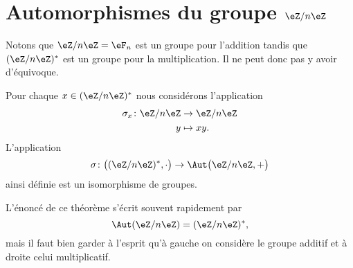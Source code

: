 \section{Automorphismes du groupe \texorpdfstring{\(  \eZ/n\eZ\)}{Z/nZ}}

Notons que \( \eZ/n\eZ=\eF_n\) est un groupe pour l'addition tandis que \( (\eZ/n\eZ)^*\) est un groupe pour la multiplication. Il ne peut donc pas y avoir d'équivoque.

\begin{theorem}   \label{ThoozyeSn}
	Pour chaque \( x\in (\eZ/n\eZ)^*\) nous considérons l'application
	\begin{equation}
		\begin{aligned}
			\sigma_x\colon \eZ/n\eZ & \to \eZ/n\eZ \\
			y                       & \mapsto xy.
		\end{aligned}
	\end{equation}
	L'application
	\begin{equation}
		\sigma\colon \big( (\eZ/n\eZ)^*,\cdot\big)\to \Aut\big( \eZ/n\eZ,+ \big)
	\end{equation}
	ainsi définie est un isomorphisme de groupes.
\end{theorem}
L'énoncé de ce théorème s'écrit souvent rapidement par
\begin{equation}
	\Aut(\eZ/n\eZ)=(\eZ/n\eZ)^*,
\end{equation}
mais il faut bien garder à l'esprit qu'à gauche on considère le groupe additif et à droite celui multiplicatif.


